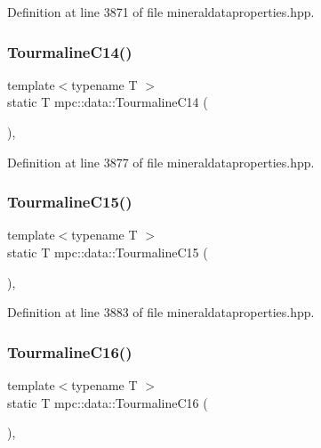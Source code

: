 Definition at line 3871 of file mineraldataproperties.\+hpp.

\mbox{\label{namespacempc_1_1data_a11760cce08732afa65cf2f8b25c2fb6a}} 
\subsubsection{\texorpdfstring{Tourmaline\+C14()}{TourmalineC14()}}
{\footnotesize\ttfamily template$<$typename T $>$ \\
static T mpc\+::data\+::\+Tourmaline\+C14 (\begin{DoxyParamCaption}{ }\end{DoxyParamCaption})\hspace{0.3cm}{\ttfamily [inline]}, {\ttfamily [static]}}



Definition at line 3877 of file mineraldataproperties.\+hpp.

\mbox{\label{namespacempc_1_1data_a9077e4ae256bd0a3fe0f571929154bd3}} 
\subsubsection{\texorpdfstring{Tourmaline\+C15()}{TourmalineC15()}}
{\footnotesize\ttfamily template$<$typename T $>$ \\
static T mpc\+::data\+::\+Tourmaline\+C15 (\begin{DoxyParamCaption}{ }\end{DoxyParamCaption})\hspace{0.3cm}{\ttfamily [inline]}, {\ttfamily [static]}}



Definition at line 3883 of file mineraldataproperties.\+hpp.

\mbox{\label{namespacempc_1_1data_a684e995cd6bc4ea2a3a0e09f4e38a583}} 
\subsubsection{\texorpdfstring{Tourmaline\+C16()}{TourmalineC16()}}
{\footnotesize\ttfamily template$<$typename T $>$ \\
static T mpc\+::data\+::\+Tourmaline\+C16 (\begin{DoxyParamCaption}{ }\end{DoxyParamCaption})\hspace{0.3cm}{\ttfamily [inline]}, {\ttfamily [static]}}



